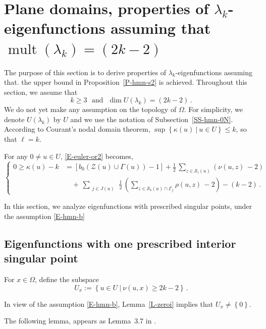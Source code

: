 \documentclass[12pt,a4paper]{amsart}
\theoremstyle{plain} %
\theoremstyle{definition}
\numberwithin{equation}{section}
\numberwithin{figure}{section}
\numberwithin{table}{section}
\newcommand{\cS}{\mathcal{S}}
\newcommand{\cZ}{\mathcal{Z}}
\DeclareMathOperator{\mult}{mult}
\newcommand{\set}[1]{\left\lbrace #1 \right\rbrace}
\begin{document}
\section{Plane domains, properties of $\lambda_k$-eigenfunctions assuming that $\mult(\lambda_k) = (2k-2)$}\label{S-hmn3}

 The purpose of this section is to derive properties of $\lambda_k$-eigenfunctions assuming that. the upper bound in Proposition~\ref{P-hmn-s2} is achieved. Throughout this section, we assume that
%
\begin{equation}\label{E-hmn-b}
k \ge 3 \text{~~and~~} \dim U(\lambda_k) = (2k-2)\,.
\end{equation}
%
We do not yet make any assumption on the topology of $\Omega$. For simplicity, we denote $U(\lambda_k)$ by $U$ and we use the notation of Subsection~\ref{SS-hmn-0N}.  According to Courant's nodal domain theorem, $\sup\set{\kappa(u) ~|~ u \in U} \le k$, so that $\ell = k$. \smallskip

For any $0 \neq u \in U$,  \eqref{E-euler-or2} becomes,
%
\begin{equation}\label{E-hmn-3a12}
\left\{
\begin{array}{ll}
0 \ge \kappa(u) - k & = \left[ b_0\left( \cZ(u) \cup \Gamma(u)\right) -1 \right]  + \frac 12 \, \sum_{z\in \cS_i(u)} \left(  \nu(u,z) \, -2\right)\\[5pt]
& \quad +\, \sum_{\substack{j\in J(u)}\,} \frac 12 \, \left(  \sum_{z\in \cS_b(u) \cap \Gamma_j}\rho(u,z) \, -2\right) - (k -2)\,.
\end{array}
\right.
\end{equation}

In this section, we analyze eigenfunctions with prescribed singular points, under the assumption \eqref{E-hmn-b}


\subsection{Eigenfunctions with one prescribed interior singular point}\label{SS-hmn-31i}

For $x \in \Omega$, define the subspace
%
\begin{equation}\label{E-hmn3-n6a}
U_x := \set{u \in U ~|~ \nu(u,x) \ge 2k - 2}\,.
\end{equation}

In view of the assumption \eqref{E-hmn-b}, Lemma~\ref{L-zeroi} implies that $U_x \neq \set{0}$. \smallskip

The following lemma, appears as  Lemma~3.7 in \cite[p.~1183]{HoMN1999}.
\end{document}
